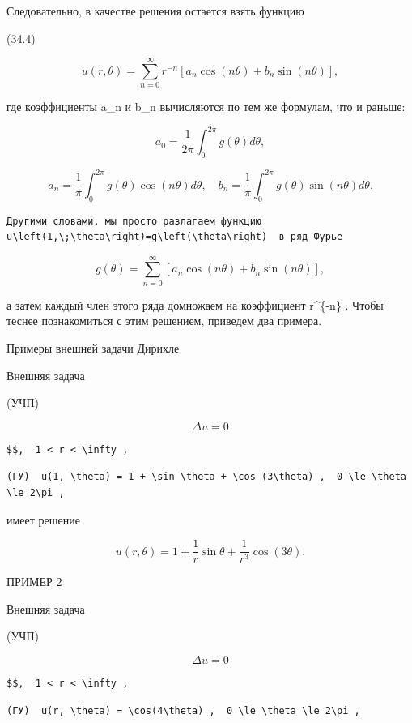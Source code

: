 \documentclass[
  ukrainian,
]{article}
\begin{document}
Следовательно, в качестве решения остается взять функцию

(34.4)

\[
u(r, \theta) = \sum_{n=0}^{\infty} r^{-n} [a_n \cos(n\theta) + b_n \sin(n\theta)],
\]

где коэффициенты a\_n и b\_n вычисляются по тем же формулам, что и
раньше:

\[
a_0 = \frac{1}{2\pi} \int_0^{2\pi} g(\theta) d\theta,
\]

\[
a_n = \frac{1}{\pi} \int_0^{2\pi} g(\theta) \cos(n\theta) d\theta, \quad b_n = \frac{1}{\pi} \int_0^{2\pi} g(\theta) \sin(n\theta) d\theta.
\]

\begin{verbatim}
Другими словами, мы просто разлагаем функцию  u\left(1,\;\theta\right)=g\left(\theta\right)  в ряд Фурье
\end{verbatim}

\[
g(\theta) = \sum_{n=0}^{\infty} [a_n \cos(n\theta) + b_n \sin(n\theta)],
\]

а затем каждый член этого ряда домножаем на коэффициент r\^{}\{-n\} .
Чтобы теснее познакомиться с этим решением, приведем два примера.

Примеры внешней задачи Дирихле

Внешняя задача

(УЧП)

\[
\Delta u = 0
\]

\begin{verbatim}
$$,  1 < r < \infty ,
\end{verbatim}

\begin{verbatim}
(ГУ)  u(1, \theta) = 1 + \sin \theta + \cos (3\theta) ,  0 \le \theta \le 2\pi ,
\end{verbatim}

имеет решение

\[
u(r, \theta) = 1 + \frac{1}{r} \sin \theta + \frac{1}{r^3} \cos (3\theta).
\]

ПРИМЕР 2

Внешняя задача

(УЧП)

\[
\Delta u = 0
\]

\begin{verbatim}
$$,  1 < r < \infty ,
\end{verbatim}

\begin{verbatim}
(ГУ)  u(r, \theta) = \cos(4\theta) ,  0 \le \theta \le 2\pi ,
\end{verbatim}
\end{document}
